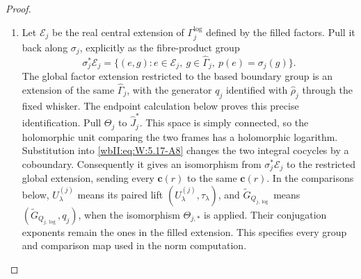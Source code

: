 \begin{proof}
\begin{enumerate}[label={$\langle1\rangle$\arabic*.},leftmargin=*]
\item Let \(\mathscr E_j\) be the real central extension of
\(\Gamma_j^{\log}\) defined by the filled factors.  Pull it back along
\(\sigma_j\), explicitly as the fibre-product group
\[
 \sigma_j^*\mathscr E_j=
 \{(e,g):e\in\mathscr E_j,\ g\in\widehat\Gamma_j,
           \ p(e)=\sigma_j(g)\}.
\]
The global factor extension restricted to the based boundary group is
an extension of the same \(\widehat\Gamma_j\), with the generator
\(q_j\) identified with \(\widehat\rho_j\) through the fixed whisker.
The endpoint calculation below proves this precise identification.
Pull \(\Theta_j\) to \(\widehat J_j^*\).  This space is simply
connected, so the holomorphic unit comparing the two frames has a
holomorphic logarithm.  Substitution into \eqref{wbII:eq:W:5.17-A8}
changes the two integral cocycles by a coboundary.  Consequently it gives
an isomorphism from \(\sigma_j^*\mathscr E_j\) to the restricted global
extension, sending every \(\mathbf c(r)\) to the same
\(\mathbf c(r)\).  In the comparisons below,
\(U_\lambda^{(j)}\) means its paired lift
\((U_\lambda^{(j)},\tau_\lambda)\), and
\(\widetilde G_{Q_{j,\log}}\) means
\((\widetilde G_{Q_{j,\log}},q_j)\), when the isomorphism
\(\Theta_{j,*}\) is applied.  Their conjugation exponents remain the
ones in the filled extension.  This specifies every group and comparison
map used in the norm computation.


\end{enumerate}
\end{proof}
